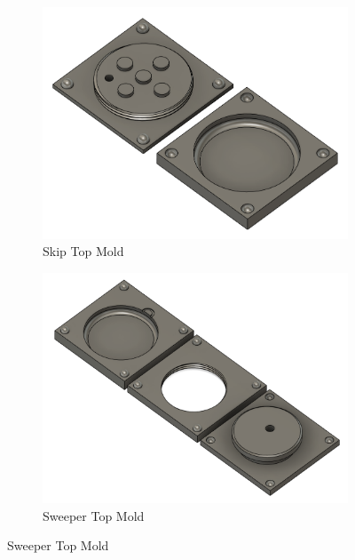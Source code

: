 \documentclass{article}
\begin{document}
\begin{figure}[ht!]
    \centering
    \begin{subfigure}{0.495\textwidth}
        \includegraphics[width=\textwidth]{skip_top_mold.png}
        \caption{Skip Top Mold}
        \label{fig:skip_top_mold}
    \end{subfigure}
    \begin{subfigure}{0.495\textwidth}
        \includegraphics[width=\textwidth]{skip_bottom_mold.png}
        \caption{Sweeper Top Mold}
        \label{fig:skip_bottom_mold}
    \end{subfigure}
\end{figure}



\end{document}
